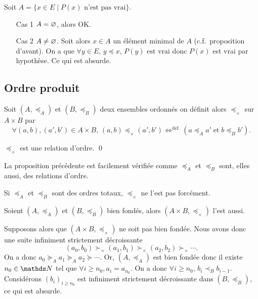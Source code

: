 \begin{prv}
	Soit $A = \{x \in E  \mid P(x) \text{ n'est pas vrai}\}$.

	\begin{itemize}
		\item[\sc Cas 1] $A = \varnothing$, alors OK.
		\item[\sc Cas 2] $A \neq \varnothing$. Soit alors $x \in A$\/ un élément minimal de $A$\/ (c.f.\ proposition d'avant). On a que $\forall y \in E,\,y \preceq x,\,P(y) \text{ est vrai}$ donc $P(x)$\/ est vrai par hypothèse. Ce qui est absurde.
	\end{itemize}
\end{prv}

\subsection{Ordre produit}

\begin{defn}
	Soit $(A, \preceq_A)$\/ et $(B, \preceq_B)$\/ deux ensembles ordonnés on définit alors $\preceq_\times$\/ sur $A\times B$\/ par \[
		\forall (a,b), (a', b') \in A \times B,\,(a,b) \preceq_\times (a',b') \mathop{\iff}^{\text{def.}}(a \preceq_A a' \mathop{\text{et}} b \preceq_B b')
	.\]
\end{defn}

\begin{prop}
	$\preceq_\times$\/ est une relation d'ordre. \qed
\end{prop}

La proposition précédente est facilement vérifiée comme $\preceq_A$\/ et $\preceq_B$\/ sont, elles aussi, des relations d'ordre.

\begin{rmk}[\danger\!\!]
	Si $\preceq_A$\/ et $\preceq_B$\/ sont des ordres totaux, $\preceq_\times$\/ ne l'est pas forcément.
\end{rmk}

\begin{prop}
	Soient $(A, \preceq_A)$\/ et $(B, \preceq_B)$\/ bien fondés, alors $(A\times B, \preceq_\times)$ l'est aussi.
\end{prop}

\begin{prv}
	Supposons alors que $(A \times B, \preceq_\times)$\/ ne soit pas bien fondée.
	Nous avons donc une suite infiniment strictement décroissante \[
		(a_0,b_0) \succ_\times (a_1, b_1) \succ_\times (a_2, b_2)\succ_\times \cdots
	.\]
	On a donc $a_0 \succeq_A a_1 \succeq_A a_2 \succeq \cdots$. Or, $(A, \preceq_A)$\/ est bien fondée donc il existe $n_0 \in \N$\/ tel que $\forall i \ge n_0, a_i = a_{n_0}$. On a donc $\forall i \ge n_0,\, b_i \prec_B b_{i-1}$.
	Considérons $(b_i)_{i \ge n_0}$\/ est infiniment strictement décroissante dans $(B, \preceq_B)$, ce qui est absurde.
\end{prv}

